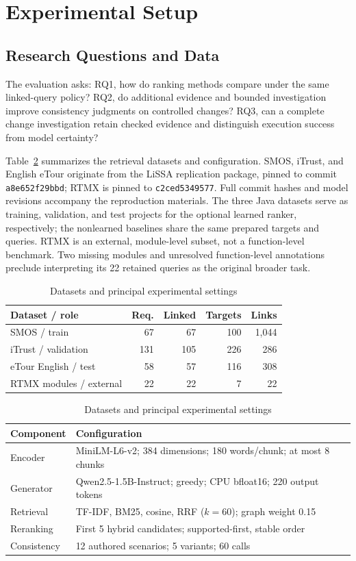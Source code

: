 \documentclass[conference,letterpaper,10pt]{IEEEtran}
\begin{document}
\section{Experimental Setup}
\subsection{Research Questions and Data}
The evaluation asks: RQ1, how do ranking methods compare under the same linked-query policy? RQ2, do additional evidence and bounded investigation improve consistency judgments on controlled changes? RQ3, can a complete change investigation retain checked evidence and distinguish execution success from model certainty?

Table~\ref{tab:setup} summarizes the retrieval datasets and configuration. SMOS, iTrust, and English eTour originate from the LiSSA replication package, pinned to commit \texttt{a8e652f29bbd}; RTMX \cite{rtmx} is pinned to \texttt{c2ced5349577}. Full commit hashes and model revisions accompany the reproduction materials. The three Java datasets serve as training, validation, and test projects for the optional learned ranker, respectively; the nonlearned baselines share the same prepared targets and queries. RTMX is an external, module-level subset, not a function-level benchmark. Two missing modules and unresolved function-level annotations preclude interpreting its 22 retained queries as the original broader task.
\begin{table}[t]
\caption{Datasets and principal experimental settings}
\label{tab:setup}\centering
\begin{tabular}{@{}lrrrr@{}}\toprule
Dataset / role & Req. & Linked & Targets & Links\\\midrule
SMOS / train & 67 & 67 & 100 & 1,044\\
iTrust / validation & 131 & 105 & 226 & 286\\
eTour English / test & 58 & 57 & 116 & 308\\
RTMX modules / external & 22 & 22 & 7 & 22\\\bottomrule
\end{tabular}
\smallskip
\begin{tabular}{@{}p{}p{}@{}}\toprule
Component & Configuration\\\midrule
Encoder & MiniLM-L6-v2; 384 dimensions; 180 words/chunk; at most 8 chunks\\
Generator & Qwen2.5-1.5B-Instruct; greedy; CPU bfloat16; 220 output tokens\\
Retrieval & TF-IDF, BM25, cosine, RRF ($k=60$); graph weight 0.15\\
Reranking & First 5 hybrid candidates; supported-first, stable order\\
Consistency & 12 authored scenarios; 5 variants; 60 calls\\\bottomrule
\end{tabular}
\end{table}
\end{document}
